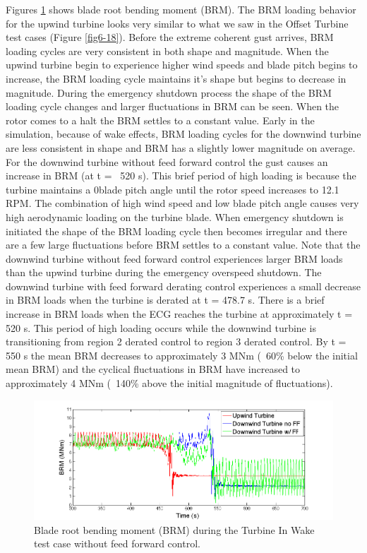 Figures \ref{fig6-31} shows blade root bending moment (BRM). The BRM loading behavior for the upwind turbine looks very similar to what we saw in the Offset Turbine test cases (Figure \ref{fig6-18}). Before the extreme coherent gust arrives, BRM loading cycles are very consistent in both shape and magnitude. When the upwind turbine begin to experience higher wind speeds and blade pitch begins to increase, the BRM loading cycle maintains it's shape but begins to decrease in magnitude. During the emergency shutdown process the shape of the BRM loading cycle changes and larger fluctuations in BRM can be seen. When the rotor comes to a halt the BRM settles to a constant value. Early in the simulation, because of wake effects, BRM loading cycles for the downwind turbine are less consistent in shape and BRM has a slightly lower magnitude on average. For the downwind turbine without feed forward control the gust causes an increase in BRM (at t = ~520 s). This brief period of high loading is because the turbine maintains a 0\degree blade pitch angle until the rotor speed increases to 12.1 RPM. The combination of high wind speed and low blade pitch angle causes very high aerodynamic loading on the turbine blade. When emergency shutdown is initiated the shape of the BRM loading cycle then becomes irregular and there are a few large fluctuations before BRM settles to a constant value. Note that the downwind turbine without feed forward control experiences larger BRM loads than the upwind turbine during the emergency overspeed shutdown. The downwind turbine with feed forward derating control experiences a small decrease in BRM loads when the turbine is derated at t = 478.7 s. There is a brief increase in BRM loads when the ECG reaches the turbine at approximately t = 520 s. This period of high loading occurs while the downwind turbine is transitioning from region 2 derated control to region 3 derated control. By t = 550 s the mean BRM decreases to approximately 3 MNm (~60\% below the initial mean BRM) and the cyclical fluctuations in BRM have increased to approximately 4 MNm (~140\% above the initial magnitude of fluctuations).

\begin{figure}[ht] 
	\centering
		\includegraphics[width = \linewidth]{Figures/ch6Figures/fig6-31.png}

	\caption{Blade root bending moment (BRM) during the Turbine In Wake test case without feed forward control.}
	\label{fig6-31}
\end{figure}

